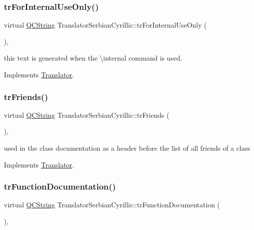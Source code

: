 \subsubsection{\texorpdfstring{trForInternalUseOnly()}{trForInternalUseOnly()}}
{\footnotesize\ttfamily virtual \mbox{\hyperlink{class_q_c_string}{Q\+C\+String}} Translator\+Serbian\+Cyrillic\+::tr\+For\+Internal\+Use\+Only (\begin{DoxyParamCaption}{ }\end{DoxyParamCaption})\hspace{0.3cm}{\ttfamily [inline]}, {\ttfamily [virtual]}}

this text is generated when the \textbackslash{}internal command is used. 

Implements \mbox{\hyperlink{class_translator}{Translator}}.

\mbox{\label{class_translator_serbian_cyrillic_a4347ef3d65f6e7b2bd85a6ca83d40ebb}} 
\subsubsection{\texorpdfstring{trFriends()}{trFriends()}}
{\footnotesize\ttfamily virtual \mbox{\hyperlink{class_q_c_string}{Q\+C\+String}} Translator\+Serbian\+Cyrillic\+::tr\+Friends (\begin{DoxyParamCaption}{ }\end{DoxyParamCaption})\hspace{0.3cm}{\ttfamily [inline]}, {\ttfamily [virtual]}}

used in the class documentation as a header before the list of all friends of a class 

Implements \mbox{\hyperlink{class_translator}{Translator}}.

\mbox{\label{class_translator_serbian_cyrillic_a1da3a2e14b6aff18ef2f76e97cf3d685}} 
\subsubsection{\texorpdfstring{trFunctionDocumentation()}{trFunctionDocumentation()}}
{\footnotesize\ttfamily virtual \mbox{\hyperlink{class_q_c_string}{Q\+C\+String}} Translator\+Serbian\+Cyrillic\+::tr\+Function\+Documentation (\begin{DoxyParamCaption}{ }\end{DoxyParamCaption})\hspace{0.3cm}{\ttfamily [inline]}, {\ttfamily [virtual]}}

